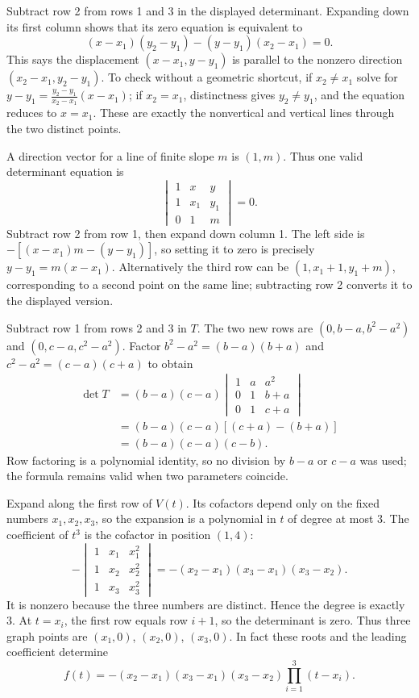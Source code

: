 Subtract row 2 from rows 1 and 3 in the displayed determinant. Expanding down its first column shows that its zero equation is equivalent to
\[
(x-x_1)(y_2-y_1)-(y-y_1)(x_2-x_1)=0.
\]
This says the displacement $(x-x_1,y-y_1)$ is parallel to the nonzero direction $(x_2-x_1,y_2-y_1)$. To check without a geometric shortcut, if $x_2\ne x_1$ solve for $y-y_1=\frac{y_2-y_1}{x_2-x_1}(x-x_1)$; if $x_2=x_1$, distinctness gives $y_2\ne y_1$, and the equation reduces to $x=x_1$. These are exactly the nonvertical and vertical lines through the two distinct points.

A direction vector for a line of finite slope $m$ is $(1,m)$. Thus one valid determinant equation is
\[
\begin{vmatrix}1&x&y\\1&x_1&y_1\\0&1&m\end{vmatrix}=0.
\]
Subtract row 2 from row 1, then expand down column 1. The left side is $-[(x-x_1)m-(y-y_1)]$, so setting it to zero is precisely $y-y_1=m(x-x_1)$. Alternatively the third row can be $(1,x_1+1,y_1+m)$, corresponding to a second point on the same line; subtracting row 2 converts it to the displayed version.

Subtract row 1 from rows 2 and 3 in $T$. The two new rows are $(0,b-a,b^2-a^2)$ and $(0,c-a,c^2-a^2)$. Factor $b^2-a^2=(b-a)(b+a)$ and $c^2-a^2=(c-a)(c+a)$ to obtain
\begin{align*}
\det T
&=(b-a)(c-a)
\begin{vmatrix}1&a&a^2\\0&1&b+a\\0&1&c+a\end{vmatrix}\\
&=(b-a)(c-a)[(c+a)-(b+a)]\\
&=(b-a)(c-a)(c-b).
\end{align*}
Row factoring is a polynomial identity, so no division by $b-a$ or $c-a$ was used; the formula remains valid when two parameters coincide.

Expand along the first row of $V(t)$. Its cofactors depend only on the fixed numbers $x_1,x_2,x_3$, so the expansion is a polynomial in $t$ of degree at most $3$. The coefficient of $t^3$ is the cofactor in position $(1,4)$:
\[
-\begin{vmatrix}1&x_1&x_1^2\\1&x_2&x_2^2\\1&x_3&x_3^2\end{vmatrix}
=-(x_2-x_1)(x_3-x_1)(x_3-x_2).
\]
It is nonzero because the three numbers are distinct. Hence the degree is exactly $3$. At $t=x_i$, the first row equals row $i+1$, so the determinant is zero. Thus three graph points are $(x_1,0)$, $(x_2,0)$, $(x_3,0)$. In fact these roots and the leading coefficient determine
\[
f(t)=-(x_2-x_1)(x_3-x_1)(x_3-x_2)\prod_{i=1}^3(t-x_i).
\]

